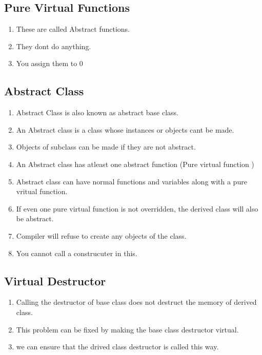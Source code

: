 \documentclass[11pt]{article}
\begin{document}
% 

\subsection{Pure Virtual Functions}
\begin{enumerate}
	\item These are called Abstract functions. 
	\item They dont do anything. 
	\item You assign them to 0
\end{enumerate}


\subsection{Abstract Class}
\begin{enumerate}
	\item Abstract Class is also known as abstract base class. 
	\item An Abstract class is a class whose instances or objects cant be made. 
	\item Objects of subclass can be made if they are not abstract. 
	\item An Abstract class has atleast one abstract function (Pure virtual function )
	\item Abstract class can have normal functions and variables along with a pure vritual function. 
	\item If even one pure virtual function is not overridden, the derived class will also be abstract. 
	\item Compiler will refuse to create any objects of the class. 
	\item You cannot call a construcuter in this. 
\end{enumerate}

\subsection{Virtual Destructor}
\begin{enumerate}
	\item Calling the destructor of base class does not destruct the memory of derived class. 
	\item This problem can be fixed by making the base class destructor virtual. 
	\item we can ensure that the drived class destructor is called this way. 
\end{enumerate}
\end{document}
